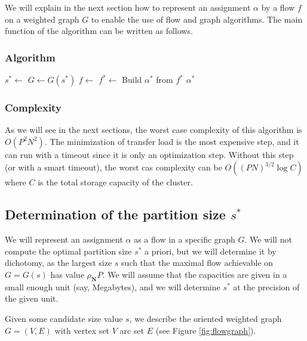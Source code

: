 \documentclass[]{article}
\begin{document}
We will explain in the next section how to represent an assignment $\alpha$ by a flow $f$ on a weighted graph $G$ to enable the use of flow and graph algorithms. The main function of the algorithm can be written as follows.

\subsubsection*{Algorithm}

\begin{algorithmic}[1]
	\State $s^* \leftarrow$ 
	\State $G \leftarrow G(s^*)$
	\State $f \leftarrow$ 	
	\State $f^* \leftarrow$ 	
	\State Build $\alpha^*$ from $f^*$
	\State \Return $\alpha^*$
	\EndFunction
\end{algorithmic}

\subsubsection*{Complexity}
As we will see in the next sections, the worst case complexity of this algorithm is $O(P^2 N^2)$. The minimization of transfer load is the most expensive step, and it can run with a timeout since it is only an optimization step. Without this step (or with a smart timeout), the worst cas complexity can be $O((PN)^{3/2}\log C)$ where $C$ is the total storage capacity of the cluster. 

\subsection{Determination of the partition size $s^*$}

We will represent an assignment $\alpha$ as a flow in a specific graph $G$. We will not compute the optimal partition size $s^*$ a priori, but we will determine it by dichotomy, as the largest size $s$ such that the maximal flow achievable on $G=G(s)$ has value $\rho_\mathbf{N}P$. We will assume that the capacities are given in a small enough unit (say, Megabytes), and we will determine $s^*$ at the precision of the given unit.

Given some candidate size value $s$, we describe the oriented weighted graph $G=(V,E)$ with vertex set $V$ arc set $E$ (see Figure \ref{fig:flowgraph}).
\end{document}
